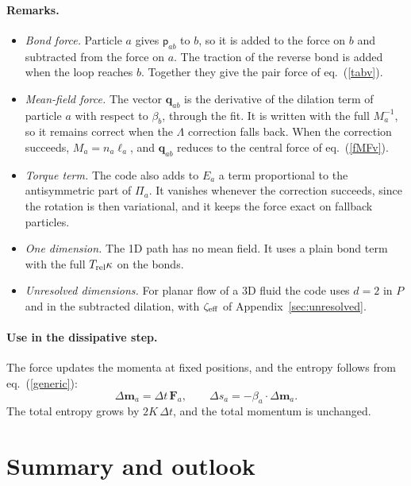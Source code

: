 \documentclass[11pt,aps,preprint,nofootinbib,superscriptaddress,tightenlines]{revtex4-2}
\def\st{\begin{equation}}
\def\stp{\end{equation}}
\def\Eq#1{eq.~(\ref{#1})}
\newcommand{\pf}{\bm{\mathsf p}}
\let\oldparagraph\paragraph
\renewcommand{\paragraph}{\par\bigskip\oldparagraph}
\begin{document}
\paragraph{Remarks.}
\begin{itemize}
\item \emph{Bond force.}  Particle $a$ gives $\pf_{ab}$ to $b$, so it is added
  to the force on $b$ and subtracted from the force on $a$.  The traction of
  the reverse bond is added when the loop reaches $b$.  Together they give the
  pair force of \Eq{tabv}.
\item \emph{Mean-field force.}  The vector $\bm q_{ab}$ is the derivative of the
  dilation term of particle $a$ with respect to $\beta_b$, through the fit.
  It is written with the full $M_a^{-1}$, so it remains correct when the
  $\Lambda$ correction falls back.  When the correction succeeds,
  $M_a=n_a\ell_a$, and $\bm q_{ab}$ reduces to the central force of
  \Eq{fMFv}.
\item \emph{Torque term.}  The code also adds to $E_a$ a term proportional to
  the antisymmetric part of $\Pi_a$.  It vanishes whenever the correction
  succeeds, since the rotation is then variational, and it keeps the force
  exact on fallback particles.
\item \emph{One dimension.}  The 1D path has no mean field.  It uses a plain
  bond term with the full $T_{\rm rel}\kappa$ on the bonds.
\item \emph{Unresolved dimensions.}  For planar flow of a 3D fluid the code
  uses $d=2$ in $P$ and in the subtracted dilation, with $\zeta_{\rm eff}$ of
  Appendix~\ref{sec:unresolved}.
\end{itemize}

\paragraph{Use in the dissipative step.}  The force updates the momenta at
fixed positions, and the entropy follows from \Eq{generic}:
\st
\Delta\bm m_a=\Delta t\,\bm F_a,\qquad
\Delta s_a=-\beta_a\cdot\Delta\bm m_a .
\stp
The total entropy grows by $2K\,\Delta t$, and the total momentum is unchanged.

\section{Summary and outlook}
\label{sec:summary}
\end{document}
